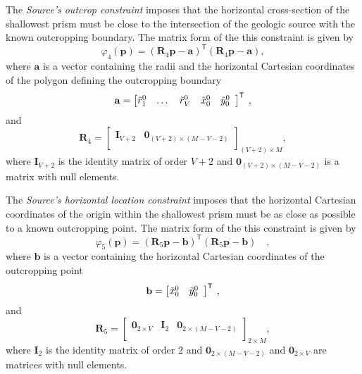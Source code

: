 The \textit{Source’s outcrop constraint} imposes that the horizontal cross-section of the shallowest prism 
must be close to the intersection of the geologic source with the known outcropping boundary. 
The matrix form of the this constraint is given by
\begin{equation}
\varphi_{4}(\mathbf{p}) = \left(\mathbf{R}_{4} \mathbf{p} - \mathbf{a} \right)^{\mathsf{T}} 
\left(\mathbf{R}_{4} \mathbf{p} - \mathbf{a} \right) ,
\end{equation}
where $\mathbf{a}$ is a vector containing the radii and the horizontal Cartesian coordinates of the 
polygon defining the outcropping boundary
\begin{equation}
\mathbf{a} = \left[ \begin{array}{@{}*{12}{c}@{}}
\tilde{r}_{1}^{0} & \dots & \tilde{r}_{V}^{0} & \tilde{x}_{0}^{0} & \tilde{y}_{0}^{0} \\
\end{array} \right]^{\mathsf{T}} \: ,
\label{eq:a-vector}
\end{equation}
and
\begin{equation}
\mathbf{R}_{4} = 
\begin{bmatrix}
\mathbf{I}_{V+2} & \mathbf{0}_{(V+2) \times (M-V-2)} \\
\end{bmatrix}_{(V+2)\times M},
\label{eq:R4-matrix}
\end{equation}
where $\mathbf{I}_{V+2}$ is the identity matrix of order $V+2$ and $\mathbf{0}_{(V+2) \times (M-V-2)}$ is a matrix 
with null elements.

The \textit{Source's horizontal location constraint} imposes that the horizontal Cartesian coordinates of the origin within 
the shallowest prism must be as close as possible to a known outcropping point. The matrix form of the this constraint is given by
\begin{equation}
\varphi_{5}(\mathbf{p}) = \left(\mathbf{R}_{5} \mathbf{p} - \mathbf{b} \right)^{\mathsf{T}}
\left(\mathbf{R}_{5} \mathbf{p} - \mathbf{b}\right) \quad ,
\end{equation}
where $\mathbf{b}$ is a vector containing the horizontal Cartesian coordinates of the outcropping point 
\begin{equation}
\mathbf{b} = \left[ \begin{array}{@{}*{12}{c}@{}}
\tilde{x}_{0}^{0} & \tilde{y}_{0}^{0} \\
\end{array} \right]^{\mathsf{T}} \: ,
\label{eq:b-vector}
\end{equation}
and
\begin{equation}
\mathbf{R}_{5} = 
\begin{bmatrix}
\mathbf{0}_{2 \times V} & \mathbf{I}_{2} & \mathbf{0}_{2 \times (M-V-2)} \\
\end{bmatrix}_{2 \times M},
\label{eq:R5-matrix}
\end{equation}
where $\mathbf{I}_{2}$ is the identity matrix of order $2$ and $\mathbf{0}_{2 \times (M-V-2)}$ and 
$\mathbf{0}_{2 \times V}$ are matrices with null elements.

